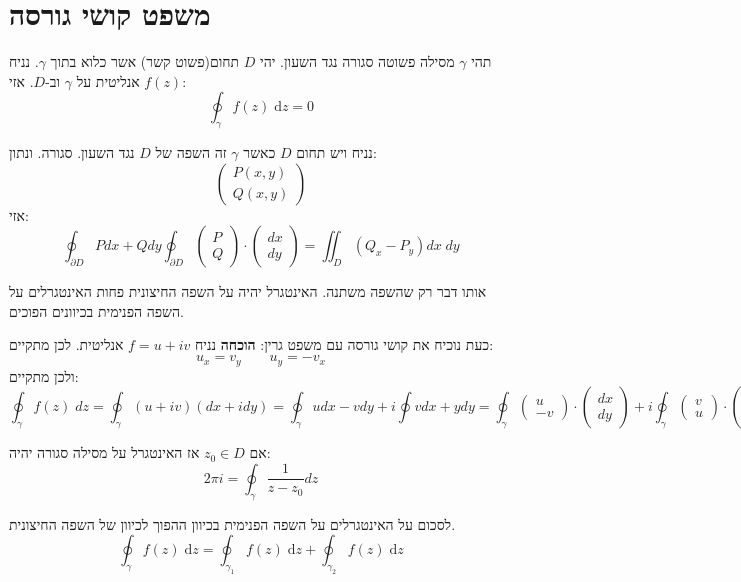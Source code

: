 \documentclass{tstextbook}
\begin{document}
\section{משפט קושי גורסה}

\begin{theorem}
תהי \(\gamma\) מסילה פשוטה סגורה נגד השעון. יהי \(D\) תחום(פשוט קשר) אשר כלוא בתוך \(\gamma\). נניח \(f(z)\) אנליטית על \(\gamma\) וב-\(D\). אזי:
$$\oint_{\gamma}f(z)\;\mathrm{d}z=0$$

\end{theorem}
\begin{theorem}[גרין]
נניח ויש תחום \(D\) כאשר \(\gamma\) זה השפה של \(D\) נגד השעון. סגורה. ונתון:
$$\begin{pmatrix}P(x,y) \\Q(x,y) 
\end{pmatrix}$$
אזי:
$$\oint_{\partial D} Pdx+Qdy\oint_{\partial D}\begin{pmatrix}P\\Q\end{pmatrix} \cdot \begin{pmatrix}dx\\ dy
\end{pmatrix} = \iint_{D} (Q_{x}-P_{y})dx\;dy$$

\end{theorem}
\begin{theorem}
אותו דבר רק שהשפה משתנה. האינטגרל יהיה על השפה החיצונית פחות האינטגרלים על השפה הפנימית בכיוונים הפוכים.

\end{theorem}
כעת נוכיח את קושי גורסה עם משפט גרין:
\textbf{הוכחה}
נניח \(f=u+iv\) אנליטית. לכן מתקיים:
$$u_{x}=v_{y}\qquad u_{y}=-v_{x}$$
ולכן מתקיים:
$$\oint_{\gamma} f(z)\;dz=\oint_{\gamma }(u+iv)(dx+idy)=\oint_{\gamma}udx-vdy+i\oint vdx+ydy = \oint_{\gamma} \begin{pmatrix}u\\ -v \end{pmatrix}\cdot \begin{pmatrix}dx \\ dy\end{pmatrix}+i\oint_{\gamma}\begin{pmatrix}v \\ u\end{pmatrix}\cdot \begin{pmatrix}dx \\ dy
\end{pmatrix}$$

\begin{proposition}
אם \(z_{0} \in D\) אז האינטגרל על מסילה סגורה יהיה:
$$2\pi i = \oint_{\gamma} \frac{1}{z-z_{0}}dz$$

\end{proposition}
\begin{theorem}
לסכום על האינטגרלים על השפה הפנימית בכיוון ההפוך לכיוון של השפה החיצונית.
$$\oint_{\gamma} f(z) \;\mathrm{d}z = \oint_{\gamma_{1}} f(z)\;\mathrm{d}z+\oint_{\gamma_{2}} f(z)\;\mathrm{d}z$$

\end{theorem}
\end{document}
